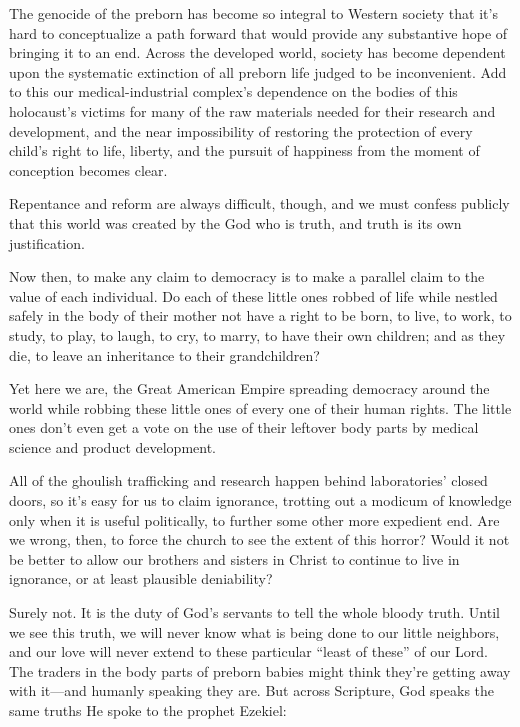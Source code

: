 \documentclass[
]{book}
\begin{document}
The genocide of the preborn has become so integral to Western society that it's hard to conceptualize a path forward that would provide any substantive hope of bringing it to an end. Across the developed world, society has become dependent upon the systematic extinction of all preborn life judged to be inconvenient. Add to this our medical-industrial complex's dependence on the bodies of this holocaust's victims for many of the raw materials needed for their research and development, and the near impossibility of restoring the protection of every child's right to life, liberty, and the pursuit of happiness from the moment of conception becomes clear.

Repentance and reform are always difficult, though, and we must confess publicly that this world was created by the God who is truth, and truth is its own justification.

Now then, to make any claim to democracy is to make a parallel claim to the value of each individual. Do each of these little ones robbed of life while nestled safely in the body of their mother not have a right to be born, to live, to work, to study, to play, to laugh, to cry, to marry, to have their own children; and as they die, to leave an inheritance to their grandchildren?

Yet here we are, the Great American Empire spreading democracy around the world while robbing these little ones of every one of their human rights. The little ones don't even get a vote on the use of their leftover body parts by medical science and product development.

All of the ghoulish trafficking and research happen behind laboratories' closed doors, so it's easy for us to claim ignorance, trotting out a modicum of knowledge only when it is useful politically, to further some other more expedient end. Are we wrong, then, to force the church to see the extent of this horror? Would it not be better to allow our brothers and sisters in Christ to continue to live in ignorance, or at least plausible deniability?

Surely not. It is the duty of God's servants to tell the whole bloody truth. Until we see this truth, we will never know what is being done to our little neighbors, and our love will never extend to these particular ``least of these'' of our Lord. The traders in the body parts of preborn babies might think they're getting away with it---and humanly speaking they are. But across Scripture, God speaks the same truths He spoke to the prophet Ezekiel:
\end{document}
